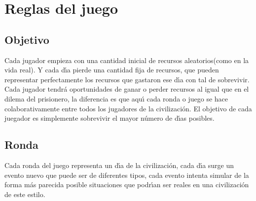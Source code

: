 \documentclass{article}
\begin{document}
\section{Reglas del juego}
\vspace*{5mm}
\subsection{Objetivo}
Cada jugador empieza con una cantidad inicial de recursos aleatorios(como en la vida real). Y cada d\'{\i}a pierde una cantidad fija de recursos, que pueden
representar perfectamente los recursos que gastaron ese d\'{\i}a con tal de sobrevivir. Cada jugador tendr\'a oportunidades de ganar o perder recursos al igual
que en el dilema del prisionero, la diferencia es que aqu\'{\i} cada ronda o juego se hace colaborativamente entre todos los jugadores de la civilizaci\'on.
El objetivo de cada juegador es simplemente sobrevivir el mayor n\'umero de d\'{\i}as posibles.

\subsection{Ronda}
Cada ronda del juego representa un d\'{\i}a de la civilizaci\'on, cada d\'{\i}a surge un evento nuevo que puede ser de diferentes tipos, cada evento intenta
simular de la forma m\'as parecida posible situaciones que podr\'{\i}an ser reales en una civilizaci\'on de este estilo.
\end{document}
